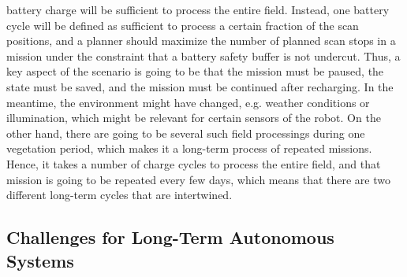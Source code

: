 \documentclass[english, master, expose, utf8]{base/thesis_KBS}
\begin{document}
battery charge will be sufficient to process the entire field. Instead, one battery cycle will be defined as sufficient to process a certain fraction of the scan
positions, and a planner should maximize the number of planned scan stops in a mission under the constraint that a battery safety buffer is not undercut.
Thus, a key aspect of the scenario is going to be that the mission must be paused, the state must be saved, and the mission must be continued after recharging.
In the meantime, the environment might have changed, e.g. weather conditions or illumination, which might be relevant for certain sensors of the robot.
On the other hand, there are going to be several such field processings during one vegetation period, which makes it a long-term process of repeated missions.
Hence, it takes a number of charge cycles to process the entire field, and that mission is going to be repeated every few days,
which means that there are two different long-term cycles that are intertwined.\newline

\subsection{Challenges for Long-Term Autonomous Systems}
\label{sec:challenges_for_lta}
\end{document}
